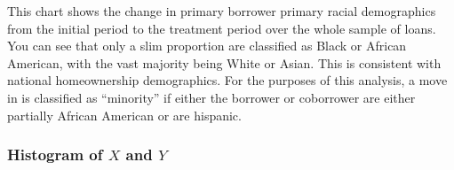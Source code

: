 \documentclass[11pt]{article}
\begin{document}
    This chart shows the change in primary borrower primary racial
demographics from the initial period to the treatment period over the
whole sample of loans. You can see that only a slim proportion are
classified as Black or African American, with the vast majority being
White or Asian. This is consistent with national homeownership
demographics. For the purposes of this analysis, a move in is classified
as ``minority'' if either the borrower or coborrower are either
partially African American or are hispanic.

    \subsubsection{\texorpdfstring{Histogram of \(X\) and
\(Y\)}{Histogram of X and Y}}\label{histogram-of-x-and-y}
\end{document}
